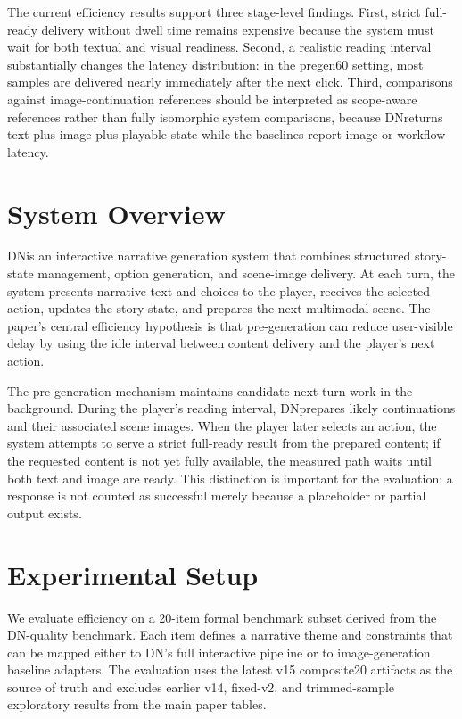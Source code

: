 ﻿\documentclass[11pt]{article}
\newcommand{\dn}{\textsc{DN}}
\begin{document}
The current efficiency results support three stage-level findings. First, strict full-ready delivery without dwell time remains expensive because the system must wait for both textual and visual readiness. Second, a realistic reading interval substantially changes the latency distribution: in the pregen60 setting, most samples are delivered nearly immediately after the next click. Third, comparisons against image-continuation references should be interpreted as scope-aware references rather than fully isomorphic system comparisons, because \dn returns text plus image plus playable state while the baselines report image or workflow latency.

\section{System Overview}
\dn is an interactive narrative generation system that combines structured story-state management, option generation, and scene-image delivery. At each turn, the system presents narrative text and choices to the player, receives the selected action, updates the story state, and prepares the next multimodal scene. The paper's central efficiency hypothesis is that pre-generation can reduce user-visible delay by using the idle interval between content delivery and the player's next action.

The pre-generation mechanism maintains candidate next-turn work in the background. During the player's reading interval, \dn prepares likely continuations and their associated scene images. When the player later selects an action, the system attempts to serve a strict full-ready result from the prepared content; if the requested content is not yet fully available, the measured path waits until both text and image are ready. This distinction is important for the evaluation: a response is not counted as successful merely because a placeholder or partial output exists.

\section{Experimental Setup}
We evaluate efficiency on a 20-item formal benchmark subset derived from the DN-quality benchmark. Each item defines a narrative theme and constraints that can be mapped either to \dn's full interactive pipeline or to image-generation baseline adapters. The evaluation uses the latest v15 composite20 artifacts as the source of truth and excludes earlier v14, fixed-v2, and trimmed-sample exploratory results from the main paper tables.
\end{document}
